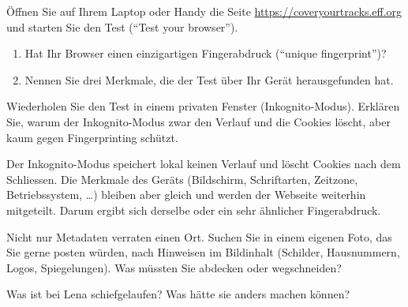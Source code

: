 \begin{myexercise}
	Öffnen Sie auf Ihrem Laptop oder Handy die Seite \url{https://coveryourtracks.eff.org} und starten Sie den Test (\enquote{Test your browser}).
	\begin{enumerate}
		\item Hat Ihr Browser einen einzigartigen Fingerabdruck (\enquote{unique fingerprint})?
		\item Nennen Sie drei Merkmale, die der Test über Ihr Gerät herausgefunden hat.
	\end{enumerate}
	\schreibzeile
	\schreibzeile
\end{myexercise}

\begin{mychallenge}
	Wiederholen Sie den Test in einem privaten Fenster (Inkognito-Modus).
	Erklären Sie, warum der Inkognito-Modus zwar den Verlauf und die Cookies löscht, aber kaum gegen Fingerprinting schützt.
	\schreibzeile
	\schreibzeile
	\begin{myanswer}
		Der Inkognito-Modus speichert lokal keinen Verlauf und löscht Cookies nach dem Schliessen.
		Die Merkmale des Geräts (Bildschirm, Schriftarten, Zeitzone, Betriebssystem, \dots) bleiben aber gleich und werden der Webseite weiterhin mitgeteilt.
		Darum ergibt sich derselbe oder ein sehr ähnlicher Fingerabdruck.
	\end{myanswer}
\end{mychallenge}

\begin{mychallenge}
	Nicht nur Metadaten verraten einen Ort. Suchen Sie in einem eigenen Foto, das Sie gerne posten würden, nach Hinweisen im Bildinhalt
	(Schilder, Hausnummern, Logos, Spiegelungen). Was müssten Sie abdecken oder wegschneiden?
\end{mychallenge}

\begin{fallakte}[-- Station A]
	Was ist bei Lena schiefgelaufen? Was hätte sie anders machen können?
	\schreibzeile
	\schreibzeile
	\schreibzeile
\end{fallakte}
